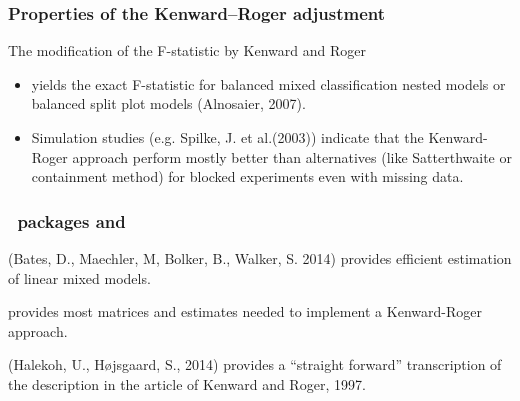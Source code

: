 \documentclass[compress]{beamer}\usepackage[]{graphicx}\usepackage[]{color}
\newenvironment{sframe}
{\begin{frame} [containsverbatim] }
  {\end{frame}}
\begin{document}
\begin{sframe}
  \frametitle{Properties of the Kenward--Roger adjustment}
The  modification of the F-statistic by Kenward and Roger
\begin{itemize}
\item
yields the exact F-statistic for balanced mixed classification nested models
or balanced split plot models (Alnosaier, 2007).
\item
Simulation studies (e.g. Spilke, J. et al.(2003)) indicate that the Kenward-Roger approach perform  mostly better than alternatives  (like Satterthwaite  or containment method) for blocked experiments even with missing data. 
\end{itemize}
\end{sframe}



\begin{sframe}
  \frametitle{{\R\ packages } and }

   (Bates, D., Maechler, M,  Bolker, B., Walker, S. 2014)
provides efficient estimation of linear mixed models.

 provides most  matrices and estimates needed 
to  implement a Kenward-Roger approach.

 (Halekoh, U.,   H{\o}jsgaard, S., 2014)
provides a ``straight forward'' transcription of the
description in the article of Kenward and Roger,  1997.

\end{sframe}

 
\end{document}
